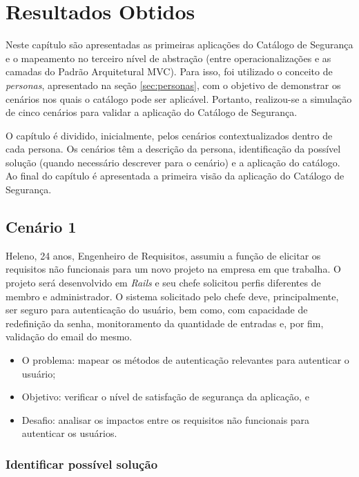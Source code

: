 \chapter{Resultados Obtidos}
\label{chap:resultadosObtidos}

Neste capítulo são apresentadas as primeiras aplicações do Catálogo de Segurança e o mapeamento no terceiro nível de abstração (entre operacionalizações e as camadas do Padrão Arquitetural MVC). Para isso, foi utilizado o conceito de \textit{personas}, apresentado na seção \ref{sec:personas}, com o objetivo de demonstrar os cenários nos quais o catálogo pode ser aplicável. Portanto, realizou-se a simulação de cinco cenários para validar a aplicação do Catálogo de Segurança. 

O capítulo é dividido, inicialmente, pelos cenários contextualizados dentro de cada persona. Os cenários têm a descrição da persona, identificação da possível solução (quando necessário descrever para o cenário) e a aplicação do catálogo. Ao final do capítulo é apresentada a primeira visão da aplicação do Catálogo de Segurança.  


\section{Cenário 1}
\label{subsec:persona1}

Heleno, 24 anos, Engenheiro de Requisitos, assumiu a função de elicitar os requisitos não funcionais para um novo projeto na empresa em que trabalha. O projeto será desenvolvido em \textit{Rails} e seu chefe solicitou perfis diferentes de membro e administrador. O sistema solicitado pelo chefe deve, principalmente, ser seguro para autenticação do usuário, bem como, com capacidade de redefinição da senha, monitoramento da quantidade de entradas e, por fim, validação do email do mesmo.

\begin{itemize}
	\item O problema: mapear os métodos de autenticação relevantes para autenticar o usuário; 
	\item Objetivo: verificar o nível de satisfação de segurança da aplicação, e
	\item Desafio: analisar os impactos entre os requisitos não funcionais para autenticar os usuários.
\end{itemize}


\subsection{Identificar possível solução}

